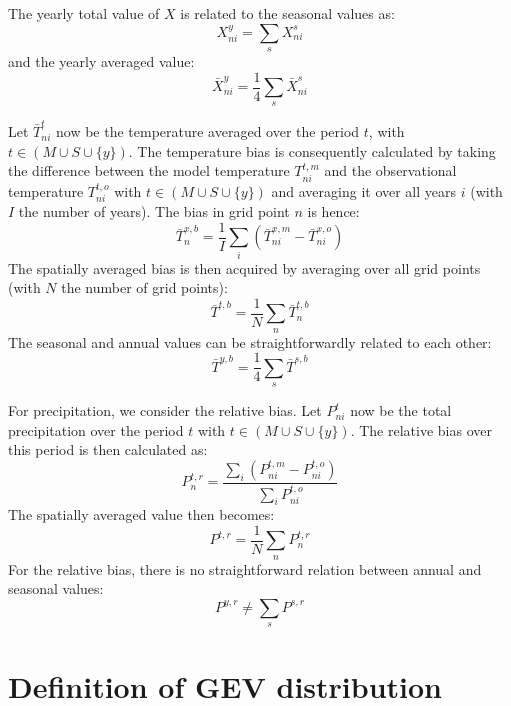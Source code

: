 \documentclass[journal abbreviation, manuscript]{copernicus}
\begin{document}
The yearly total value of $X$ is related to the seasonal values as:
\begin{equation*}
    X^y_{ni} = \sum_{s} X^s_{ni}
\end{equation*}
and the yearly averaged value:
\begin{equation*}
    \bar{X}^y_{ni} = \frac{1}{4} \sum_{s} \bar{X}^s_{ni}
\end{equation*}

Let $\bar{T}^{t}_{ni}$ now be the temperature averaged over the period $t$, with $t \in (M \cup S \cup \{y\})$. The temperature bias is consequently calculated by taking the difference between the model temperature $T^{t,m}_{ni}$ and the observational temperature $T^{t,o}_{ni}$ with $t \in (M \cup S \cup \{y\})$ and averaging it over all years $i$ (with $I$ the number of years). The bias in grid point $n$ is hence:
\begin{equation*}
    \bar{T}^{x,b}_{n} = \frac{1}{I} \sum_{i} \left(\bar{T}^{x,m}_{ni} - \bar{T}^{x,o}_{ni} \right)
\end{equation*}
The spatially averaged bias is then acquired by averaging over all grid points (with $N$ the number of grid points):
\begin{equation*}
    \bar{T}^{t,b} = \frac{1}{N} \sum_{n} \bar{T}^{t,b}_{n} 
\end{equation*}
The seasonal and annual values can be straightforwardly related to each other:
\begin{equation*}
    \bar{T}^{y,b} = \frac{1}{4} \sum_{s} \bar{T}^{s,b}
\end{equation*}

For precipitation, we consider the relative bias. Let $P^{t}_{ni}$ now be the total precipitation over the period $t$ with $t \in (M \cup S \cup \{y\})$. The relative bias over this period is then calculated as:
\begin{equation*}
    P^{t,r}_{n} = \frac{ \sum_{i} \left(P^{t,m}_{ni} - P^{t,o}_{ni} \right)}{\sum_{i} P^{t,o}_{ni}}
\end{equation*}
The spatially averaged value then becomes:
\begin{equation*}
    P^{t,r} = \frac{1}{N} \sum_{n} P^{t,r}_{n}
\end{equation*}
For the relative bias, there is no straightforward relation between annual and seasonal values: 
\begin{equation*}
    P^{y,r} \neq \sum_{s} P^{s,r}
\end{equation*}

\section{Definition of GEV distribution}
\label{sect:gev_definition}
\end{document}
